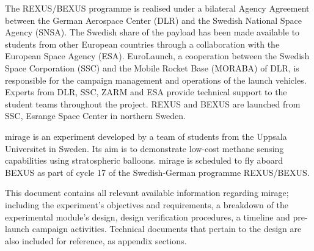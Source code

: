 The REXUS/BEXUS programme is realised under a bilateral Agency Agreement between the German Aerospace Center (DLR) and the Swedish National Space Agency (SNSA). The Swedish share of the payload has been made available to students from other European countries through a collaboration with the European Space Agency (ESA). EuroLaunch, a cooperation between the Swedish Space Corporation (SSC) and the Mobile Rocket Base (MORABA) of DLR, is responsible for the campaign management and operations of the launch vehicles. Experts from DLR, SSC, ZARM and ESA provide technical support to the student teams throughout the project. REXUS and BEXUS are launched from SSC, Esrange Space Center in northern Sweden.

\gls{mirage} is an experiment developed by a team of students from the Uppsala Universitet in Sweden. Its aim is to demonstrate low-cost methane sensing capabilities using stratospheric balloons. \gls{mirage} is scheduled to fly aboard BEXUS as part of cycle 17 of the Swedish-German programme REXUS/BEXUS.

This document contains all relevant available information regarding \gls{mirage}; including the experiment's objectives and requirements, a breakdown of the experimental module's design, design verification procedures, a timeline and pre-launch campaign activities. Technical documents that pertain to the design are also included for reference, as appendix sections.
